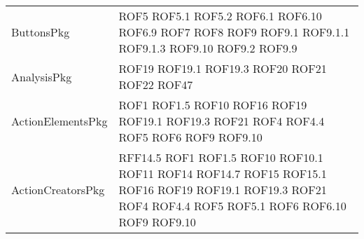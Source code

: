 \begin{longtable}{p{5cm}!{\VRule[1pt]}p{2.5cm}}
		ButtonsPkg & ROF5 \newline ROF5.1 \newline ROF5.2 \newline ROF6.1 \newline ROF6.10 \newline ROF6.9 \newline ROF7 \newline ROF8 \newline ROF9 \newline ROF9.1 \newline ROF9.1.1 \newline ROF9.1.3 \newline ROF9.10 \newline ROF9.2 \newline ROF9.9\\
		AnalysisPkg & ROF19 \newline ROF19.1 \newline ROF19.3 \newline ROF20 \newline ROF21 \newline ROF22 \newline ROF47\\
		ActionElementsPkg & ROF1 \newline ROF1.5 \newline ROF10 \newline ROF16 \newline ROF19 \newline ROF19.1 \newline ROF19.3 \newline ROF21 \newline ROF4 \newline ROF4.4 \newline ROF5 \newline ROF6 \newline ROF9 \newline ROF9.10\\
		ActionCreatorsPkg & RFF14.5 \newline ROF1 \newline ROF1.5 \newline ROF10 \newline ROF10.1 \newline ROF11 \newline ROF14 \newline ROF14.7 \newline ROF15 \newline ROF15.1 \newline ROF16 \newline ROF19 \newline ROF19.1 \newline ROF19.3 \newline ROF21 \newline ROF4 \newline ROF4.4 \newline ROF5 \newline ROF5.1 \newline ROF6 \newline ROF6.10 \newline ROF9 \newline ROF9.10\\

\end{longtable}
